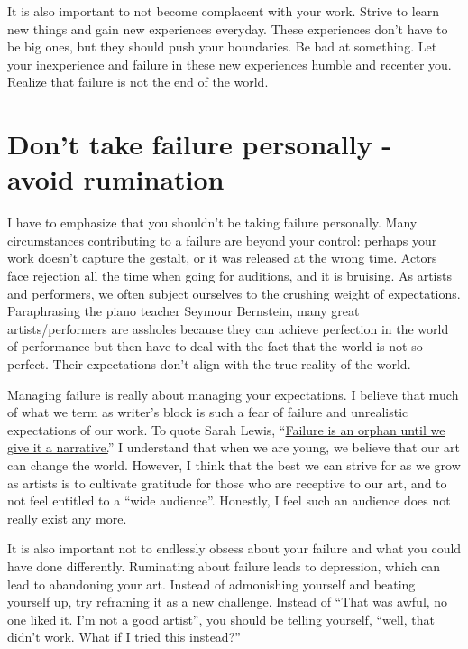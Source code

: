 \documentclass[
]{book}
\begin{document}
It is also important to not become complacent with your work. Strive to learn new things and gain new experiences everyday. These experiences don't have to be big ones, but they should push your boundaries. Be bad at something. Let your inexperience and failure in these new experiences humble and recenter you. Realize that failure is not the end of the world.

\hypertarget{dont-take-failure-personally---avoid-rumination}{%
\section{Don't take failure personally - avoid rumination}\label{dont-take-failure-personally---avoid-rumination}}

I have to emphasize that you shouldn't be taking failure personally. Many circumstances contributing to a failure are beyond your control: perhaps your work doesn't capture the gestalt, or it was released at the wrong time. Actors face rejection all the time when going for auditions, and it is bruising. As artists and performers, we often subject ourselves to the crushing weight of expectations. Paraphrasing the piano teacher Seymour Bernstein, many great artists/performers are assholes because they can achieve perfection in the world of performance but then have to deal with the fact that the world is not so perfect. Their expectations don't align with the true reality of the world.

Managing failure is really about managing your expectations. I believe that much of what we term as writer's block is such a fear of failure and unrealistic expectations of our work. To quote Sarah Lewis, ``\href{https://www.goodreads.com/book/show/18143786-the-rise}{Failure is an orphan until we give it a narrative.}'' I understand that when we are young, we believe that our art can change the world. However, I think that the best we can strive for as we grow as artists is to cultivate gratitude for those who are receptive to our art, and to not feel entitled to a ``wide audience''. Honestly, I feel such an audience does not really exist any more.

It is also important not to endlessly obsess about your failure and what you could have done differently. Ruminating about failure leads to depression, which can lead to abandoning your art. Instead of admonishing yourself and beating yourself up, try reframing it as a new challenge. Instead of ``That was awful, no one liked it. I'm not a good artist'', you should be telling yourself, ``well, that didn't work. What if I tried this instead?''
\end{document}
